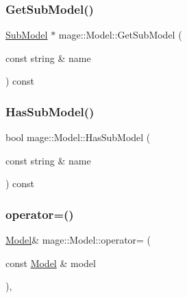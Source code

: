 \hypertarget{classmage_1_1_model_a1cae9eb62a353445d14b5331e88bdeac}{}\label{classmage_1_1_model_a1cae9eb62a353445d14b5331e88bdeac} 
\subsubsection{\texorpdfstring{Get\+Sub\+Model()}{GetSubModel()}}
{\footnotesize\ttfamily \hyperlink{classmage_1_1_sub_model}{Sub\+Model} $\ast$ mage\+::\+Model\+::\+Get\+Sub\+Model (\begin{DoxyParamCaption}\item[{const string \&}]{name }\end{DoxyParamCaption}) const}

\hypertarget{classmage_1_1_model_a319fb9b9d9c673ed9c83325d5bcbdfd7}{}\label{classmage_1_1_model_a319fb9b9d9c673ed9c83325d5bcbdfd7} 
\subsubsection{\texorpdfstring{Has\+Sub\+Model()}{HasSubModel()}}
{\footnotesize\ttfamily bool mage\+::\+Model\+::\+Has\+Sub\+Model (\begin{DoxyParamCaption}\item[{const string \&}]{name }\end{DoxyParamCaption}) const}

\hypertarget{classmage_1_1_model_a563515c64ec39cfcda9f6ca37576391b}{}\label{classmage_1_1_model_a563515c64ec39cfcda9f6ca37576391b} 
\subsubsection{\texorpdfstring{operator=()}{operator=()}}
{\footnotesize\ttfamily \hyperlink{classmage_1_1_model}{Model}\& mage\+::\+Model\+::operator= (\begin{DoxyParamCaption}\item[{const \hyperlink{classmage_1_1_model}{Model} \&}]{model }\end{DoxyParamCaption})\hspace{0.3cm}{\ttfamily [private]}, {\ttfamily [delete]}}

